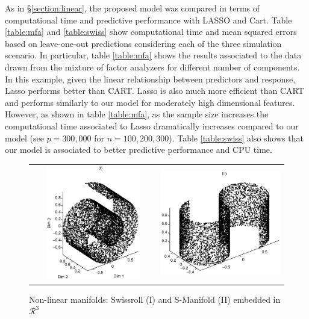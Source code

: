 As in \S \ref{section:linear}, the proposed model was compared in terms of computational time and predictive performance with LASSO and Cart. Table \ref{table:mfa} and \ref{table:swiss}  show computational time and mean squared errors based on leave-one-out predictions considering each of the three simulation scenario.  In particular, table \ref{table:mfa} shows the results associated to the data drawn from the mixture of factor analyzers for different number of components. In this example, given the linear relationship between predictors and response, Lasso performs better than CART. Lasso is also much more efficient than CART and performs similarly to our model for moderately high dimensional features. However, as shown in table \ref{table:mfa}, as the sample size increases the computational time associated to Lasso dramatically increases compared to our model (see $p=300,000$ for $n=100, 200, 300$). Table \ref{table:swiss} also shows that our model is associated to better predictive performance and CPU time.




\begin{figure}
\centering
\begin{tabular}{cc}
\includegraphics[width=60mm,height=50mm]{Swissroll.eps} & \includegraphics[width=60mm,height=50mm]{SManifold.eps}
\end{tabular}
\caption{Non-linear manifolds: Swissroll (I) and S-Manifold (II) embedded in $\mathcal{R}^3$} \label{manifold:nonlinear}
\end{figure}



